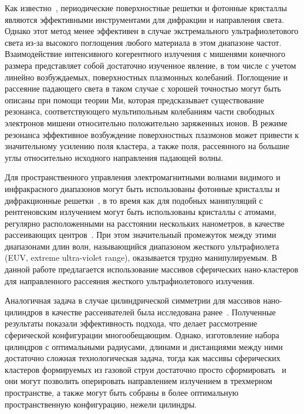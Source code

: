 Как известно~\cite{lin_zhang, batterman_cole}, периодические поверхностные решетки и фотонные кристаллы являются эффективными инструментами для дифракции и направления света. Однако этот метод менее эффективен в случае экстремального ультрафиолетового света из-за высокого поглощения любого материала в этом диапазоне частот. Взаимодействие интенсивного когерентного излучения с мишенями конечного размера представляет собой достаточно изученное явление, в том числе с учетом линейно возбуждаемых, поверхностных плазмонных колебаний. Поглощение и рассеяние падающего света в таком случае с хорошей точностью могут быть описаны при помощи теории Ми, которая предсказывает существование резонанса, соответствующего мультипольным колебаниям части свободных электронов мишени относительно положительно заряженных ионов. В режиме резонанса эффективное возбуждение поверхностных плазмонов может привести к значительному усилению поля кластера, а также поля, рассеянного на большие углы относительно исходного направления падающей волны. 

Для пространственного управления электромагнитными волнами видимого и инфракрасного диапазонов могут быть использованы фотонные кристаллы и дифракционные решетки~\cite{lin_zhang}, в то время как для подобных манипуляций с рентгеновским излучением могут быть использованы кристаллы с атомами, регулярно расположенными на расстоянии нескольких нанометров, в качестве рассеивающих центров~\cite{batterman_cole}. При этом значительный промежуток между этими диапазонами длин волн, называющийся диапазоном жесткого ультрафиолета (EUV, extreme ultra-violet range), оказывается трудно манипулируемым. В данной работе предлагается использование массивов сферических нано-кластеров для направленного рассеяния жесткого ультрафиолетового излучения. 

Аналогичная задача в случае цилиндрической симметрии для массивов нано-цилиндров в качестве рассеивателей была исследована ранее~\cite{andreev_lecz}. Полученные результаты показали эффективность подхода, что делает рассмотрение сферической конфигурации многообещающим. Однако, изготовление набора цилиндров с оптимальными радиусами, длинами и дистанциями между ними достаточно сложная технологическая задача, тогда как массивы сферических кластеров формируемых из газовой струи достаточно просто сформировать~\cite{wftwfwqf} и они могут позволить оперировать направлением излучением в трехмерном пространстве, а также могут быть собраны в более оптимальную пространственную конфигурацию, нежели цилиндры.


